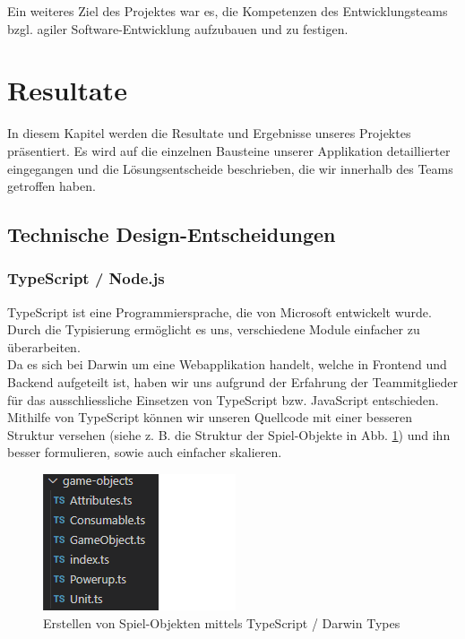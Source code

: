 \documentclass[11pt,a4paper,titlepage]{article}
\begin{document}
Ein weiteres Ziel des Projektes war es, die Kompetenzen des Entwicklungsteams bzgl. agiler Software-Entwicklung aufzubauen und zu festigen.

\newpage

\section{Resultate}
In diesem Kapitel werden die Resultate und Ergebnisse unseres Projektes präsentiert.
Es wird auf die einzelnen Bausteine unserer Applikation detaillierter eingegangen und die Lösungsentscheide beschrieben, die wir innerhalb des Teams getroffen haben.

\subsection{Technische Design-Entscheidungen}
\subsubsection{TypeScript / Node.js}
TypeScript ist eine Programmiersprache, die von Microsoft entwickelt wurde. Durch die Typisierung ermöglicht es uns, verschiedene Module einfacher zu überarbeiten.\\
Da es sich bei Darwin um eine Webapplikation handelt, welche in Frontend und Backend aufgeteilt ist, haben wir uns aufgrund der Erfahrung der Teammitglieder für das ausschliessliche Einsetzen von TypeScript bzw. JavaScript entschieden.
Mithilfe von TypeScript können wir unseren Quellcode mit einer besseren Struktur versehen (siehe z. B. die Struktur der Spiel-Objekte in Abb. \ref{types}) und ihn besser formulieren, sowie auch einfacher skalieren.

\begin{figure}[H]
	\centering
	\includegraphics{darwintypes.png}
	\caption{Erstellen von Spiel-Objekten mittels TypeScript / Darwin Types}
	\label{types}
\end{figure}
\end{document}
